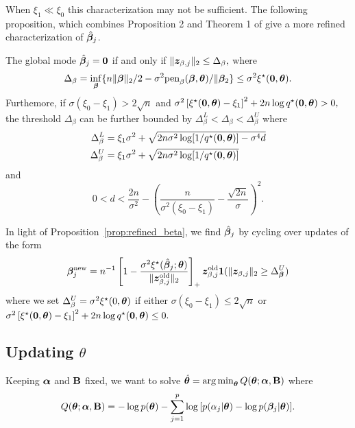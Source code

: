 When $\xi_{1} \ll \xi_{0}$ this characterization may not be sufficient.
The following proposition, which combines Proposition 2 and Theorem 1 of \citet{Bai2020} give a more refined characterization of $\hat{\boldsymbol{\beta}}_{j}$.
\begin{proposition}
\label{prop:refined_beta}
The global mode $\hat{\boldsymbol{\beta}}_{j} = \mathbf{0}$ if and only if $\lVert \bm{z}_{\beta,j}\rVert_{2} \leq \Delta_{\beta},$ where
$$
\Delta_{\beta} = \inf_{\boldsymbol{\beta}}\{n\lVert \boldsymbol{\beta} \rVert_{2}/2 - \sigma^{2}\text{pen}_{\beta}(\boldsymbol{\beta}, \boldsymbol{\theta})/\lVert \boldsymbol{\beta}_{2}\} \leq \sigma^{2}\xi^{\star}(\mathbf{0},\boldsymbol{\theta}).
$$
Furthemore, if $\sigma(\xi_{0} - \xi_{1}) > 2\sqrt{n}$ and $\sigma^{2}\left[\xi^{\star}(\mathbf{0},\boldsymbol{\theta}) - \xi_{1}\right]^{2} + 2n\log{q^{\star}(\mathbf{0},\boldsymbol{\theta})} > 0,$ the threshold $\Delta_{\beta}$ can be further bounded by $\Delta^{L}_{\beta} < \Delta_{\beta} < \Delta^{U}_{\beta}$ where
\begin{align*}
\Delta^{L}_{\beta} &= \xi_{1}\sigma^{2} + \sqrt{2n\sigma^{2}\log[1/q^{\star}(\mathbf{0},\boldsymbol{\theta})] - \sigma^{4}d} \\
\Delta^{U}_{\beta} &= \xi_{1}\sigma^{2} + \sqrt{2n\sigma^{2}\log[1/q^{\star}(\mathbf{0},\boldsymbol{\theta})]}
\end{align*} 
and 
$$
0 < d < \frac{2n}{\sigma^{2}} - \left(\frac{n}{\sigma^{2}(\xi_{0} - \xi_{1})} - \frac{\sqrt{2n}}{\sigma}\right)^{2}.
$$

\end{proposition}
In light of Proposition~\ref{prop:refined_beta}, we find $\hat{\boldsymbol{\beta}}_{j}$ by cycling over updates of the form
\begin{equation}
\label{eq:refined_beta_update}
\boldsymbol{\beta}_{j}^{\text{new}} = n^{-1}\left[1 - \frac{\sigma^{2}\xi^{\star}(\hat{\boldsymbol{\beta}}_{j}; \boldsymbol{\theta})}{\lVert \bm{z}^{\text{old}}_{\beta,j} \rVert_{2}}\right]_{+}\bm{z}^{\text{old}}_{\beta,j} \mathbf{1}(\lVert \bm{z}_{\beta,j} \rVert_{2} \geq \Delta^{U}_{\boldsymbol{\beta}})
\end{equation}
where we set $\Delta^{U}_{\beta} = \sigma^{2}\xi^{\star}(0, \boldsymbol{\theta})$ if either $\sigma(\xi_{0} - \xi_{1}) \leq 2\sqrt{n}$ or $\sigma^{2}\left[\xi^{\star}(\mathbf{0},\boldsymbol{\theta}) - \xi_{1}\right]^{2} + 2n\log{q^{\star}(\mathbf{0},\boldsymbol{\theta})} \leq 0.$


\subsection{Updating $\theta$}

Keeping $\boldsymbol{\alpha}$ and $\mathbf{B}$ fixed, we want to solve $\hat{\boldsymbol{\theta}} = \operatorname*{arg\,min}_{\boldsymbol{\theta}}Q(\boldsymbol{\theta}; \boldsymbol{\alpha}, \mathbf{B})$ where
$$
Q(\boldsymbol{\theta}; \boldsymbol{\alpha}, \mathbf{B}) = -\log{p(\boldsymbol{\theta})} - \sum_{j = 1}^{p}{\log{[p(\alpha_{j} \vert \boldsymbol{\theta})} - \log{p(\boldsymbol{\beta}_{j} \vert \boldsymbol{\theta})}]}.
$$

